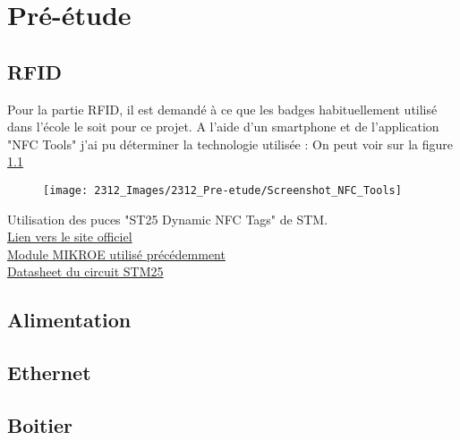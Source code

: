 \cleardoublepage
\chapter{Pré-étude}

\section{RFID}

Pour la partie RFID, il est demandé à ce que les badges habituellement utilisé dans
l'école le soit pour ce projet. A l'aide d'un smartphone et de l'application "NFC Tools"
j'ai pu déterminer la technologie utilisée :
On peut voir sur la figure \ref{fig:screenshotnfctools}

\begin{figure}[h]
	\centering
	\texttt{[image: 2312\_Images/2312\_Pre-etude/Screenshot\_NFC\_Tools]}
	\caption{}
	\label{fig:screenshotnfctools}
\end{figure}

Utilisation des puces "ST25 Dynamic NFC Tags" de STM. \\
\href{https://www.st.com/en/nfc/st25-dynamic-nfc-tags.html}{Lien vers le site officiel} \\
\href{https://www.mikroe.com/rfid-click}{Module MIKROE utilisé précédemment} \\
\href{https://www.st.com/content/ccc/resource/technical/document/datasheet/e2/ed/a5/4c/6b/42/46/91/DM00097458.pdf/files/DM00097458.pdf/jcr:content/translations/en.DM00097458.pdf}{Datasheet du circuit STM25}

\section{Alimentation}

\section{Ethernet}

\section{Boitier}

\section{}